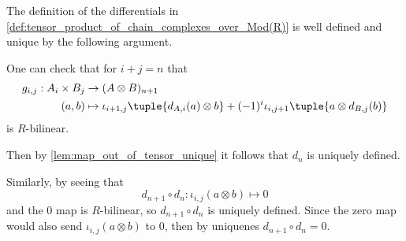 \begin{remark}
    The definition of the differentials in \autoref{def:tensor_product_of_chain_complexes_over_Mod(R)} is well defined and unique by the following argument.

    One can check that for \( i + j = n \) that
    \begin{align*}
        g_{i, j}: A_i \times B_j &\to (A \otimes B)_{n + 1} \\
        (a, b) &\mapsto \iota_{i + 1, j}\tuple{d_{A, i}(a) \otimes b} + (-1)^{i} \iota_{i, j + 1}\tuple{a \otimes d_{B, j}(b)}
    \end{align*}
    is \( R \)-bilinear.

    Then by \autoref{lem:map_out_of_tensor_unique} it follows that \( d_n \) is uniquely defined.

    Similarly, by seeing that
    \[
        d_{n + 1} \circ d_n: \iota_{i, j}(a \otimes b) \mapsto 0
    \]
    and the \( 0 \) map is \( R \)-bilinear, so \( d_{n + 1} \circ d_n \) is uniquely defined. Since the zero map would also send \( \iota_{i, j}(a \otimes b) \) to \( 0 \), then by uniquenes \( d_{n + 1} \circ d_n = 0 \).
\end{remark}

